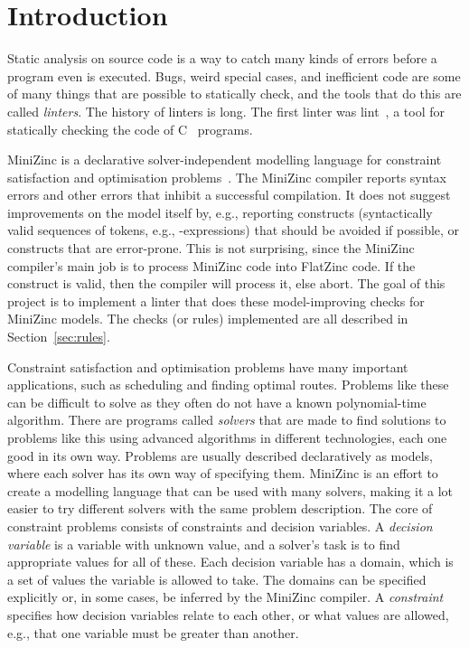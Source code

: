 \documentclass[a4paper,12pt]{article}
\newcommand{\leblanc}{\clearpage\thispagestyle{empty}\null\clearpage}
\begin{document}
\leblanc

\tableofcontents

\cleardoublepage

\mainmatter

\section{Introduction}\label{sec:introduktion}
Static analysis on source code is a way to catch many kinds of errors before
a program even is executed.
Bugs, weird special cases, and inefficient code are some of many things that are possible
to statically check, and the tools that do this are called \emph{linters}. 
The history of linters is long. The first linter was lint~\cite{lint}, a tool for
statically checking the code of C~\cite{c1978} programs.

MiniZinc is a declarative solver-independent modelling language for constraint
satisfaction and optimisation problems~\cite{MiniZinc}. The MiniZinc compiler reports
syntax errors and other errors that inhibit a successful compilation. It does not suggest
improvements on the model itself by, e.g., reporting constructs (syntactically valid
sequences of tokens, e.g., -expressions) that should be avoided if possible, or
constructs that are error-prone. This is not surprising, since the MiniZinc compiler's main job is to
process MiniZinc code into FlatZinc code. 
If the construct is valid, then the compiler will
process it, else abort. The goal of this project is to implement a linter that does these
model-improving checks for MiniZinc models. The checks (or rules) implemented are all
described in Section~\ref{sec:rules}.

Constraint satisfaction and optimisation problems have many important applications, such
as scheduling and finding optimal routes. Problems like these can be difficult to solve as
they often do not have a known polynomial-time algorithm. There are programs called
\emph{solvers} that are made to find solutions to problems like this using advanced
algorithms in different technologies, each one good in its own way. Problems are usually
described declaratively as models, where each solver has its own way of specifying them.
MiniZinc is an effort to create a modelling language that can be used with many
solvers, making it a lot easier to try different solvers with the same problem
description. The core of constraint problems consists of constraints and
decision variables. A \emph{decision variable} is a variable with unknown value, and a
solver's task is to find appropriate values for all of these. Each decision variable has a domain, which
is a set of values the variable is allowed to take. The domains can be specified explicitly or,
in some cases, be inferred by the MiniZinc compiler. A \emph{constraint} specifies how
decision variables relate to each other, or what values are allowed, e.g., that one
variable must be greater than another.
\end{document}
